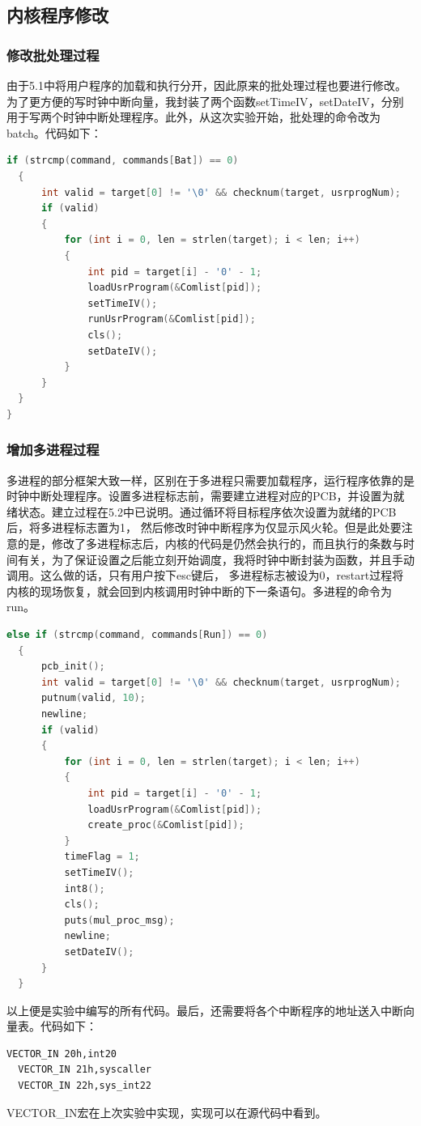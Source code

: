 \documentclass[a4paper, 11pt]{article} %
\begin{document}
\subsection{内核程序修改}

\subsubsection{修改批处理过程}

由于5.1中将用户程序的加载和执行分开，因此原来的批处理过程也要进行修改。为了更方便的写时钟中断向量，我封装了两个函数setTimeIV，setDateIV，分别用于写两个时钟中断处理程序。此外，从这次实验开始，批处理的命令改为batch。代码如下：
\begin{lstlisting}[language={c},label=batch,caption=批处理过程（部分代码）]
  if (strcmp(command, commands[Bat]) == 0)
  {
      int valid = target[0] != '\0' && checknum(target, usrprogNum);
      if (valid)
      {
          for (int i = 0, len = strlen(target); i < len; i++)
          {
              int pid = target[i] - '0' - 1;
              loadUsrProgram(&Comlist[pid]);
              setTimeIV();
              runUsrProgram(&Comlist[pid]);
              cls();
              setDateIV();
          }
      }
  }
}
\end{lstlisting}

\subsubsection{增加多进程过程}

多进程的部分框架大致一样，区别在于多进程只需要加载程序，运行程序依靠的是时钟中断处理程序。设置多进程标志前，需要建立进程对应的PCB，并设置为就绪状态。建立过程在5.2中已说明。通过循环将目标程序依次设置为就绪的PCB后，将多进程标志置为1，
然后修改时钟中断程序为仅显示风火轮。但是此处要注意的是，修改了多进程标志后，内核的代码是仍然会执行的，而且执行的条数与时间有关，为了保证设置之后能立刻开始调度，我将时钟中断封装为函数，并且手动调用。这么做的话，只有用户按下esc键后，
多进程标志被设为0，restart过程将内核的现场恢复，就会回到内核调用时钟中断的下一条语句。多进程的命令为run。
\begin{lstlisting}[language={c},label=run,caption=多进程过程（部分代码）]
  else if (strcmp(command, commands[Run]) == 0)
  {
      pcb_init();
      int valid = target[0] != '\0' && checknum(target, usrprogNum);
      putnum(valid, 10);
      newline;
      if (valid)
      {
          for (int i = 0, len = strlen(target); i < len; i++)
          {
              int pid = target[i] - '0' - 1;
              loadUsrProgram(&Comlist[pid]);
              create_proc(&Comlist[pid]);
          }
          timeFlag = 1;
          setTimeIV();
          int8();
          cls();
          puts(mul_proc_msg);
          newline;
          setDateIV();
      }
  }
\end{lstlisting}
以上便是实验中编写的所有代码。最后，还需要将各个中断程序的地址送入中断向量表。代码如下：
\begin{lstlisting}[language={[x86masm]Assembler},label=IVT,caption=将中断程序地址写入中断向量表]
  VECTOR_IN 20h,int20
  VECTOR_IN 21h,syscaller
  VECTOR_IN 22h,sys_int22
\end{lstlisting}
VECTOR\_IN宏在上次实验中实现，实现可以在源代码中看到。
\end{document}
